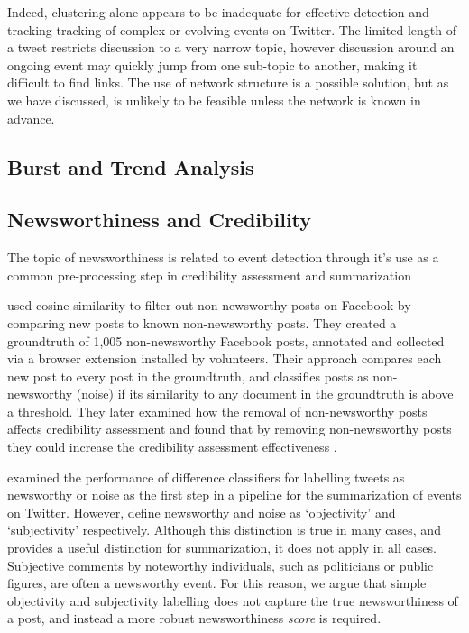 Indeed, clustering alone appears to be inadequate for effective detection and tracking tracking of complex or evolving events on Twitter.
The limited length of a tweet restricts discussion to a very narrow topic, however discussion around an ongoing event may quickly jump from one sub-topic to another, making it difficult to find links.
The use of network structure is a possible solution, but as we have discussed, is unlikely to be feasible unless the network is known in advance.

\subsection{Burst and Trend Analysis}

\subsection{Newsworthiness and Credibility}
The topic of newsworthiness is related to event detection through it's use as a common pre-processing step in credibility assessment and summarization \citep{Noyunsan17, Madhawa15}

\cite{Noyunsan16} used cosine similarity to filter out non-newsworthy posts on Facebook by comparing new posts to known non-newsworthy posts.
They created a groundtruth of 1,005 non-newsworthy Facebook posts, annotated and collected via a browser extension installed by volunteers.
Their approach compares each new post to every post in the groundtruth, and classifies posts as non-newsworthy (noise) if its similarity to any document in the groundtruth is above a threshold.
They later examined how the removal of non-newsworthy posts affects credibility assessment and found that by removing non-newsworthy posts they could increase the credibility assessment effectiveness \citep{Noyunsan17}.

\cite{Madhawa15} examined the performance of difference classifiers for labelling tweets as newsworthy or noise as the first step in a pipeline for the summarization of events on Twitter.
However, \cite{Madhawa15} define newsworthy and noise as `objectivity' and `subjectivity' respectively.
Although this distinction is true in many cases, and provides a useful distinction for summarization, it does not apply in all cases.
Subjective comments by noteworthy individuals, such as politicians or public figures, are often a newsworthy event.
For this reason, we argue that simple objectivity and subjectivity labelling does not capture the true newsworthiness of a post, and instead a more robust newsworthiness \emph{score} is required.

